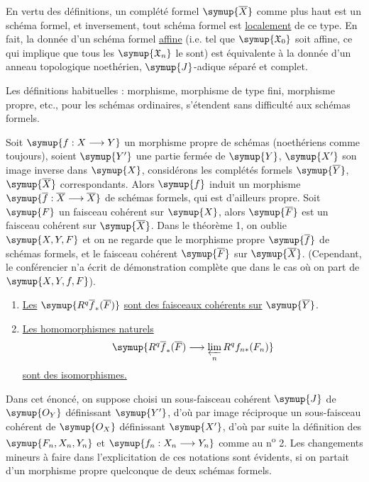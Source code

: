 En vertu des définitions, un complété formel $\symup{\overline X}$ comme plus haut est
un schéma formel, et inversement, tout schéma formel est \uline{localement} de ce
type. En fait, la donnée d'un schéma formel \uline{affine} (i.e. tel que
$\symup{\mathfrak X_0}$ soit affine, ce qui implique que tous les $\symup{\mathfrak X_n}$ le
sont) est équivalente à la donnée d'un anneau topologique noethérien,
$\symup{J}$-adique séparé et complet.

Les définitions habituelles : morphisme, morphisme de type fini, morphisme
propre, etc., pour les schémas ordinaires, s'étendent sans difficulté aux
schémas formels.


Soit $\symup{f:X\longrightarrow Y}$ un morphisme propre de schémas (noethériens comme
toujours), soient $\symup{Y'}$ une partie fermée de $\symup{Y}$, $\symup{X'}$ son image inverse dans $\symup{X}$,
considérons les complétés formels $\symup{\overline Y}$, $\symup{\overline X}$ correspondants.
Alors $\symup{f}$ induit un morphisme
$\symup{\overline f:\overline X\longrightarrow\overline X}$ de schémas formels, qui est
d'ailleurs propre. Soit $\symup{F}$ un faisceau cohérent sur $\symup{X}$, alors $\symup{\overline F}$
est un faisceau cohérent sur $\symup{\overline X}$. Dans le théorème 1, on oublie
$\symup{X,Y,F}$ et on ne regarde que le morphisme propre $\symup{\overline f}$ de schémas
formels, et le faisceau cohérent $\symup{\overline F}$ sur $\symup{\overline X}$. (Cependant,
le conférencier n'a écrit de démonstration complète que dans le cas où on part
de $\symup{X,Y,f,F}$).

\begin{enumerate}
  \item[\textnormal{i.}] \uline{Les} $\symup{R^{q}\overline f_{*}(\overline F)}$ \uline{sont des faisceaux
    cohérents sur} $\symup{\overline Y}$.
  \item[\textnormal{ii.}] \uline{Les homomorphismes naturels}
    \[
      \symup{R^{q}\overline f_{*}(\overline F)
      \longrightarrow \varprojlim\limits_n R^{q}f_{n*}(F_n)}
    \]
    \uline{sont des isomorphismes.}
\end{enumerate}

Dans cet énoncé, on suppose choisi un sous-faisceau cohérent $\symup{J}$ de $\symup{O_Y}$
définissant $\symup{Y'}$, d'où par image réciproque un sous-faisceau cohérent de
$\symup{O_X}$ définissant $\symup{X'}$, d'où par suite la définition des $\symup{F_n,X_n,Y_n}$ et
$\symup{f_n:X_n\longrightarrow Y_n}$ comme au n\textsuperscript{o} 2. Les changements
mineurs à faire dans l'explicitation de ces notations sont évidents, si on
partait d'un morphisme propre quelconque de deux schémas formels.

